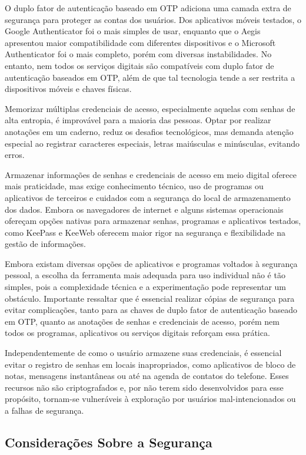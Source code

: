 \documentclass[12pt]{article}
\begin{document}
O duplo fator de autenticação baseado em OTP adiciona uma camada extra de segurança
para proteger as contas dos usuários.
Dos aplicativos móveis testados, o Google Authenticator foi o mais simples de usar,
enquanto que o Aegis apresentou maior compatibilidade com diferentes dispositivos e
o Microsoft Authenticator foi o mais completo, porém com diversas instabilidades.
No entanto, nem todos os serviços digitais são compatíveis com duplo fator de
autenticação baseados em OTP, além de que tal tecnologia tende a ser restrita a
dispositivos móveis e chaves físicas.

Memorizar múltiplas credenciais de acesso, especialmente aquelas com senhas de alta
entropia, é improvável para a maioria das pessoas.
Optar por realizar anotações em um caderno, reduz os desafios tecnológicos, mas
demanda atenção especial ao registrar caracteres especiais, letras maiúsculas e
minúsculas, evitando erros.

Armazenar informações de senhas e credenciais de acesso em meio digital oferece mais
praticidade, mas exige conhecimento técnico, uso de programas ou aplicativos de
terceiros e cuidados com a segurança do local de armazenamento dos dados.
Embora os navegadores de internet e alguns sistemas operacionais ofereçam opções
nativas para armazenar senhas, programas e aplicativos testados, como KeePass e KeeWeb
oferecem maior rigor na segurança e flexibilidade na gestão de informações.

Embora existam diversas opções de aplicativos e programas voltados à segurança
pessoal, a escolha da ferramenta mais adequada para uso individual não é tão
simples, pois a complexidade técnica e a experimentação pode representar um obstáculo.
Importante ressaltar que é essencial realizar cópias de segurança para evitar
complicações, tanto para as chaves de duplo fator de autenticação baseado em OTP,
quanto as anotações de senhas e credenciais de acesso, porém nem todos os programas,
aplicativos ou serviços digitais reforçam essa prática.

Independentemente de como o usuário armazene suas credenciais, é essencial evitar o
registro de senhas em locais inapropriados, como aplicativos de bloco de notas,
mensagens instantâneas ou até na agenda de contatos do telefone.
Esses recursos não são criptografados e, por não terem sido desenvolvidos para esse
propósito, tornam-se vulneráveis à exploração por usuários mal-intencionados ou a falhas
de segurança.

\subsection{Considerações Sobre a Segurança}
\end{document}
